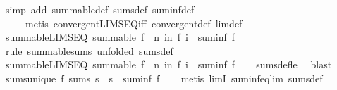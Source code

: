 \begin{isabellebody}
\endisadelimproof
%
\isatagproof
{}\isamarkupfalse%
\ {\isacharparenleft}{\kern0pt}simp\ add{\isacharcolon}{\kern0pt}\ summable{\isacharunderscore}{\kern0pt}def\ sums{\isacharunderscore}{\kern0pt}def\ suminf{\isacharunderscore}{\kern0pt}def{\isacharparenright}{\kern0pt}\isanewline
\ \ \ \ \ {\isacharparenleft}{\kern0pt}metis\ convergent{\isacharunderscore}{\kern0pt}LIMSEQ{\isacharunderscore}{\kern0pt}iff\ convergent{\isacharunderscore}{\kern0pt}def\ lim{\isacharunderscore}{\kern0pt}def{\isacharparenright}{\kern0pt}%
\endisatagproof
{\isafoldproof}%
%
\isadelimproof
\isanewline
%
\endisadelimproof
\isanewline
{}\isamarkupfalse%
\ summable{\isacharunderscore}{\kern0pt}LIMSEQ{\isacharcolon}{\kern0pt}\ {\isachardoublequoteopen}summable\ f\ {\isasymLongrightarrow}\ {\isacharparenleft}{\kern0pt}{\isasymlambda}n{\isachardot}{\kern0pt}\ {\isasymSum}i{\isacharless}{\kern0pt}n{\isachardot}{\kern0pt}\ f\ i{\isacharparenright}{\kern0pt}\ {\isasymlonglonglongrightarrow}\ suminf\ f{\isachardoublequoteclose}\isanewline
%
\isadelimproof
\ \ %
\endisadelimproof
%
\isatagproof
{}\isamarkupfalse%
\ {\isacharparenleft}{\kern0pt}rule\ summable{\isacharunderscore}{\kern0pt}sums\ {\isacharbrackleft}{\kern0pt}unfolded\ sums{\isacharunderscore}{\kern0pt}def{\isacharbrackright}{\kern0pt}{\isacharparenright}{\kern0pt}%
\endisatagproof
{\isafoldproof}%
%
\isadelimproof
\isanewline
%
\endisadelimproof
\isanewline
{}\isamarkupfalse%
\ summable{\isacharunderscore}{\kern0pt}LIMSEQ{\isacharprime}{\kern0pt}{\isacharcolon}{\kern0pt}\ {\isachardoublequoteopen}summable\ f\ {\isasymLongrightarrow}\ {\isacharparenleft}{\kern0pt}{\isasymlambda}n{\isachardot}{\kern0pt}\ {\isasymSum}i{\isasymle}n{\isachardot}{\kern0pt}\ f\ i{\isacharparenright}{\kern0pt}\ {\isasymlonglonglongrightarrow}\ suminf\ f{\isachardoublequoteclose}\isanewline
%
\isadelimproof
\ \ %
\endisadelimproof
%
\isatagproof
{}\isamarkupfalse%
\ sums{\isacharunderscore}{\kern0pt}def{\isacharunderscore}{\kern0pt}le\ \isamarkupfalse%
\ blast%
\endisatagproof
{\isafoldproof}%
%
\isadelimproof
\isanewline
%
\endisadelimproof
\isanewline
{}\isamarkupfalse%
\ sums{\isacharunderscore}{\kern0pt}unique{\isacharcolon}{\kern0pt}\ {\isachardoublequoteopen}f\ sums\ s\ {\isasymLongrightarrow}\ s\ {\isacharequal}{\kern0pt}\ suminf\ f{\isachardoublequoteclose}\isanewline
%
\isadelimproof
\ \ %
\endisadelimproof
%
\isatagproof
{}\isamarkupfalse%
\ {\isacharparenleft}{\kern0pt}metis\ limI\ suminf{\isacharunderscore}{\kern0pt}eq{\isacharunderscore}{\kern0pt}lim\ sums{\isacharunderscore}{\kern0pt}def{\isacharparenright}{\kern0pt}%

\end{isabellebody}

